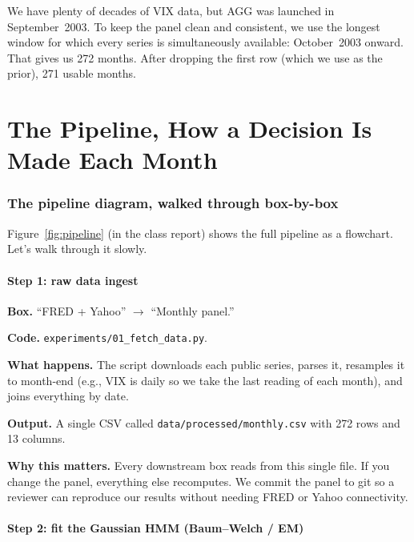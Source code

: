 \documentclass[11pt]{article}
\begin{document}
\begin{walkthrough}
We have plenty of decades of VIX data, but AGG was launched in September~2003. To keep the panel clean and consistent, we use the longest window for which every series is simultaneously available: October~2003 onward. That gives us 272 months. After dropping the first row (which we use as the prior), 271 usable months.
\end{walkthrough}

\part{The Pipeline, How a Decision Is Made Each Month}

\section{The pipeline diagram, walked through box-by-box}

Figure~\ref{fig:pipeline} (in the class report) shows the full pipeline as a flowchart. Let's walk through it slowly.

\subsection{Step 1: raw data ingest}

\textbf{Box.} ``FRED + Yahoo'' $\to$ ``Monthly panel.''

\textbf{Code.} \texttt{experiments/01\_fetch\_data.py}.

\textbf{What happens.} The script downloads each public series, parses it, resamples it to month-end (e.g., VIX is daily so we take the last reading of each month), and joins everything by date.

\textbf{Output.} A single CSV called \texttt{data/processed/monthly.csv} with 272 rows and 13 columns.

\textbf{Why this matters.} Every downstream box reads from this single file. If you change the panel, everything else recomputes. We commit the panel to git so a reviewer can reproduce our results without needing FRED or Yahoo connectivity.

\subsection{Step 2: fit the Gaussian HMM (Baum--Welch / EM)}
\end{document}
